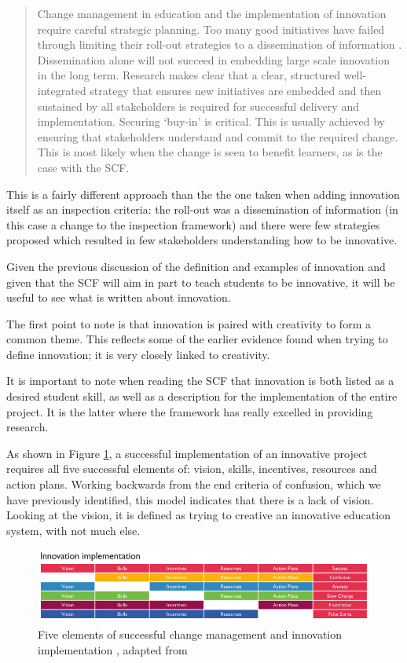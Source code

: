 \documentclass[11pt]{article}
\begin{document}
\begin{quote}
	Change management in education and the implementation of innovation require careful strategic planning. Too many good initiatives have failed through limiting their roll-out strategies to a dissemination of information \citep{Cordingley2007}. Dissemination alone will not succeed in embedding large scale innovation in the long term. Research makes clear that a clear, structured well-integrated strategy that ensures new initiatives are embedded and then sustained by all stakeholders is required for successful delivery and implementation. Securing `buy-in' is critical. This is usually achieved by ensuring that stakeholders understand and commit to the required change. This is most likely when the change is seen to benefit learners, as is the case with the SCF.
\end{quote}

This is a fairly different approach than the the one taken when adding innovation itself as an inspection criteria: the roll-out was a dissemination of information (in this case a change to the inspection framework) and there were few strategies proposed which resulted in few stakeholders understanding how to be innovative.

Given the previous discussion of the definition and examples of innovation and given that the SCF will aim in part to teach students to be innovative, it will be useful to see what is written about innovation.

The first point to note is that innovation is paired with creativity to form a common theme. This reflects some of the earlier evidence found when trying to define innovation; it is very closely linked to creativity.

It is important to note when reading the SCF that innovation is both listed as a desired student skill, as well as a description for the implementation of the entire project. It is the latter where the framework has really excelled in providing research.

As shown in Figure \ref{fig:implementation}, a successful implementation of an innovative project requires all five successful elements of: vision, skills, incentives, resources and action plans. Working backwards from the end criteria of confusion, which we have previously identified, this model indicates that there is a lack of vision. Looking at the vision, it is defined as trying to creative an innovative education system, with not much else.

\begin{figure}[h]
	\centering
		\captionsetup{justification=centering}
	\includegraphics[scale=0.57]{figures/innovation-implementation}
	\caption{Five elements of successful change management and innovation implementation \citep{ADEC2016}, adapted from \cite{Thousand2001}}
\label{fig:implementation} 
\end{figure}
\end{document}
